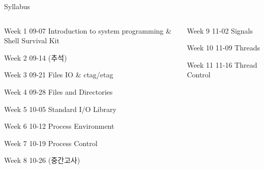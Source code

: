 \documentclass[newPxFont,sthlmFooter,nooffset]{beamer}
\begin{document}
\begin{frame}[t]{Syllabus}
\begin{columns}\small
\begin{column}{.48\linewidth}
\hangindent=1cm
Week 1 09-07 Introduction to system programming \& Shell Survival Kit

Week 2 09-14 (추석)

\hangindent=1cm
Week 3 09-21 Files IO \& ctag/etag

\hangindent=1cm
Week 4 09-28 Files and Directories

\hangindent=1cm
Week 5 10-05 Standard I/O Library

\hangindent=1cm
Week 6 10-12 Process Environment

Week 7 10-19 Process Control

Week 8 10-26 (중간고사)
\end{column}

\begin{column}{.48\linewidth}
Week 9 11-02 Signals

Week 10 11-09 Threads

Week 11 11-16 Thread Control


\end{column}
\end{columns}
\end{frame}
\end{document}
